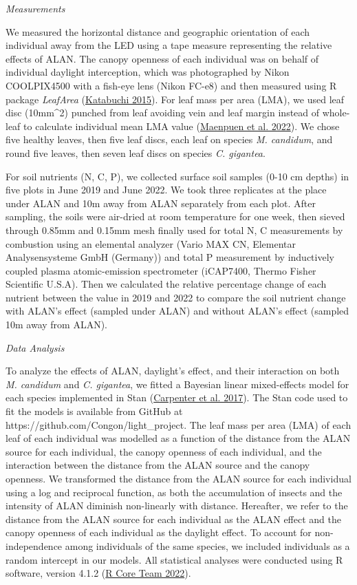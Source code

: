 \documentclass[
  12pt,
  letterpaper,
  DIV=11,
  numbers=noendperiod]{scrartcl}
\begin{document}
\emph{Measurements}

We measured the horizontal distance and geographic orientation of each
individual away from the LED using a tape measure representing the
relative effects of ALAN. The canopy openness of each individual was on
behalf of individual daylight interception, which was photographed by
Nikon COOLPIX4500 with a fish-eye lens (Nikon FC-e8) and then measured
using R package \emph{LeafArea}
(\protect\hyperlink{ref-Katabuchi2015}{Katabuchi 2015}). For leaf mass
per area (LMA), we used leaf disc (10mm\^{}2) punched from leaf avoiding
vein and leaf margin instead of whole-leaf to calculate individual mean
LMA value (\protect\hyperlink{ref-Maenpuen2022}{Maenpuen et al. 2022}).
We chose five healthy leaves, then five leaf discs, each leaf on species
\emph{M. candidum}, and round five leaves, then seven leaf discs on
species \emph{C. gigantea}.

For soil nutrients (N, C, P), we collected surface soil samples (0-10 cm
depths) in five plots in June 2019 and June 2022. We took three
replicates at the place under ALAN and 10m away from ALAN separately
from each plot. After sampling, the soils were air-dried at room
temperature for one week, then sieved through 0.85mm and 0.15mm mesh
finally used for total N, C measurements by combustion using an
elemental analyzer (Vario MAX CN, Elementar Analysensysteme GmbH
(Germany)) and total P measurement by inductively coupled plasma
atomic-emission spectrometer (iCAP7400, Thermo Fisher Scientific U.S.A).
Then we calculated the relative percentage change of each nutrient
between the value in 2019 and 2022 to compare the soil nutrient change
with ALAN's effect (sampled under ALAN) and without ALAN's effect
(sampled 10m away from ALAN).

\emph{Data Analysis}

To analyze the effects of ALAN, daylight's effect, and their interaction
on both \emph{M. candidum} and \emph{C. gigantea}, we fitted a Bayesian
linear mixed-effects model for each species implemented in Stan
(\protect\hyperlink{ref-Carpenter2017}{Carpenter et al. 2017}). The Stan
code used to fit the models is available from GitHub at
https://github.com/Congon/light\_project. The leaf mass per area (LMA)
of each leaf of each individual was modelled as a function of the
distance from the ALAN source for each individual, the canopy openness
of each individual, and the interaction between the distance from the
ALAN source and the canopy openness. We transformed the distance from
the ALAN source for each individual using a log and reciprocal function,
as both the accumulation of insects and the intensity of ALAN diminish
non-linearly with distance. Hereafter, we refer to the distance from the
ALAN source for each individual as the ALAN effect and the canopy
openness of each individual as the daylight effect. To account for
non-independence among individuals of the same species, we included
individuals as a random intercept in our models. All statistical
analyses were conducted using R software, version 4.1.2
(\protect\hyperlink{ref-RCoreTeam2022}{R Core Team 2022}).
\end{document}
